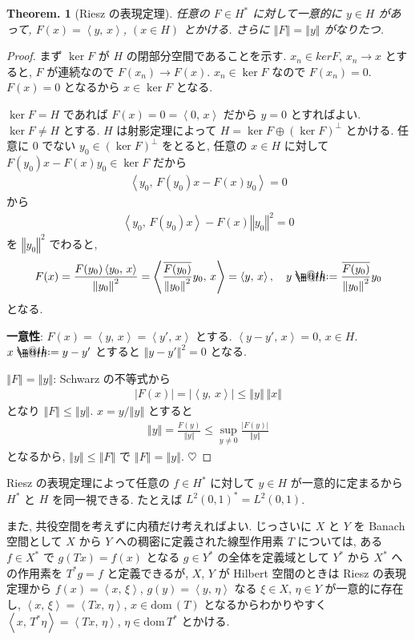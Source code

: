 \documentclass[openany, a4paper, oneside]{book}
\makeatletter
\newcommand*{\defeq}{\mathrel{\rlap{%
\raisebox{0.3ex}{$\m@th\cdot$}}%
\raisebox{-0.3ex}{$\m@th\cdot$}}%
=}
\newcommand{\dom}{\mathrm{dom}\,}
\theoremstyle{break}
\newtheorem{thm}{Theorem.}[section]
\theoremstyle{breakdefn}
\newcommand{\abs}[1]{\left|#1\right|}
\newcommand{\norm}[1]{\left\Vert#1\right\Vert}
\newcommand{\rbk}[1]{\left (#1\right)}
\newcommand{\bkt}[2]{\left\langle#1,\,#2\right\rangle}
\makeatother
\begin{document}
\begin{thm}[Riesz の表現定理]\label{functional_analysis_hilbert_space_yukimi_11}
 任意の $F \in H^*$ に対して一意的に $y \in H$ があって, $F(x) = \bkt{y}{x}$, $(x \in H)$ とかける.
 さらに $\norm{F} = \norm{y}$ がなりたつ.
\end{thm}
\begin{proof}
まず $\ker F$ が $H$ の閉部分空間であることを示す.
$x_n \in ker F$, $x_{n} \to x$ とすると,
$F$ が連続なので $F (x_n) \to F (x)$.
$x_n \in \ker F$ なので $F (x_n) = 0$.
$F(x) = 0$ となるから $x \in \ker F$ となる.

$\ker F = H$ であれば $F(x) = 0 = \bkt{0}{x}$ だから $y = 0$ とすればよい.
$\ker F \neq H$ とする.
$H$ は射影定理によって $H = \ker F \oplus (\ker F)^\perp$ とかける.
任意に $0$ でない $y_0 \in (\ker F)^\perp$ をとると, 任意の $x \in H$ に対して
$F(y_0) x - F (x) y_0 \in \ker F$ だから
\begin{align}
 \bkt{y_0}{F \rbk{y_0} x - F(x) y_0}
 =
 0
\end{align}
から
\begin{align}
 \bkt{y_0}{F(y_0) x} - F(x) \norm{y_0}^2
 =
 0
\end{align}
を $\norm{y_0}^2$ でわると,
\begin{align}
 F(x)
 =
 \frac{F(y_0) \bkt{y_0}{x}}{\norm{y_0}^2}
 =
 \bkt{\frac{\overline{F(y_0)}}{\norm{y_0}^2} y_0}{x}
 =
 \bkt{y}{x}, \quad
 y
 \defeq
 \frac{\overline{F(y_0)}}{\norm{y_0}^2} y_0
\end{align}
となる.

\textbf{一意性}:
$F (x) = \bkt{y}{x} = \bkt{y'}{x}$ とする.
$\bkt{y - y'}{x} = 0$, $x \in H$.
$x \defeq y - y'$ とすると $\norm{y - y'}^2 = 0$ となる.

$\norm{F} = \norm{y}$:
Schwarz の不等式から
\begin{align}
 \abs{F(x)}
 =
 \abs{\bkt{y}{x}}
 \leq
 \norm{y} \, \norm{x}
\end{align}
となり $\norm{F} \leq \norm{y}$.
$x = y / \norm{y}$ とすると
\begin{align}
 \norm{y} = \frac{F(y)}{\norm{y}}
 \leq
 \sup_{y \neq 0} \frac{\abs{F(y)}}{\norm{y}}
\end{align}
となるから,  $\norm{y} \leq \norm{F}$ で $\norm{F} = \norm{y}$.
$\heartsuit$
\end{proof}

Riesz の表現定理によって任意の $f \in H^*$ に対して $y \in H$ が一意的に定まるから
$H^*$ と $H$ を同一視できる.
たとえば $L^2 (0, 1)^* = L^2 (0, 1)$.

また, 共役空間を考えずに内積だけ考えればよい.
じっさいに $X$ と $Y$ を Banach 空間として $X$ から $Y$ への稠密に定義された線型作用素 $T$ については,
ある $f \in X^*$ で $g (Tx) = f (x)$ となる $g \in Y^*$ の全体を定義域として
$Y^*$ から $X^*$ への作用素を $T^*g = f$ と定義できるが,
$X$, $Y$ が Hilbert 空間のときは Riesz の表現定理から
$f (x) = \bkt{x}{\xi}$, $g (y) = \bkt{y}{\eta}$ なる $\xi \in X$,
$\eta \in Y$ が一意的に存在し,
$\bkt{x}{\xi} = \bkt{Tx}{\eta}$,
$x \in \dom (T)$ となるからわかりやすく
$\bkt{x}{T^* \eta} = \bkt{Tx}{\eta}$, $\eta \in \dom T^*$ とかける.
\end{document}
